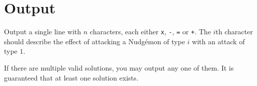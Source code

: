 \section*{Output}
Output a single line with $n$ characters, each either \texttt{x},
\texttt{-}, \texttt{=} or \texttt{+}. %
The $i$th character should describe the effect of attacking a
Nudg\'emon of type $i$ with an attack of type $1$.

If there are multiple valid solutions, you may output any one of them.
It is guaranteed that at least one solution exists.
